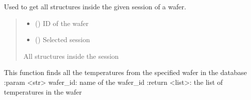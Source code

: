 \documentclass[letterpaper,10pt,english]{sphinxmanual}
\begin{document}

\begin{fulllineitems}
\label{\detokenize{getter:getter.get_structures}}
\pysigstartsignatures
{}
\pysigstopsignatures
\sphinxAtStartPar
Used to get all structures  inside the given session of a wafer.
\begin{quote}\begin{description}
\begin{itemize}
\item {} 
\sphinxAtStartPar
{} () \textendash{} ID of the wafer

\item {} 
\sphinxAtStartPar
{} () \textendash{} Selected session

\end{itemize}

\sphinxAtStartPar
All structures inside the session

\end{description}\end{quote}

\end{fulllineitems}


\begin{fulllineitems}
\label{\detokenize{getter:getter.get_temps}}
\pysigstartsignatures
{}
\pysigstopsignatures
\sphinxAtStartPar
This function finds all the temperatures from the specified wafer in the database
:param \textless{}str\textgreater{} wafer\_id: name of the wafer\_id
:return \textless{}list\textgreater{}: the list of temperatures in the wafer

\end{fulllineitems}
\end{document}
